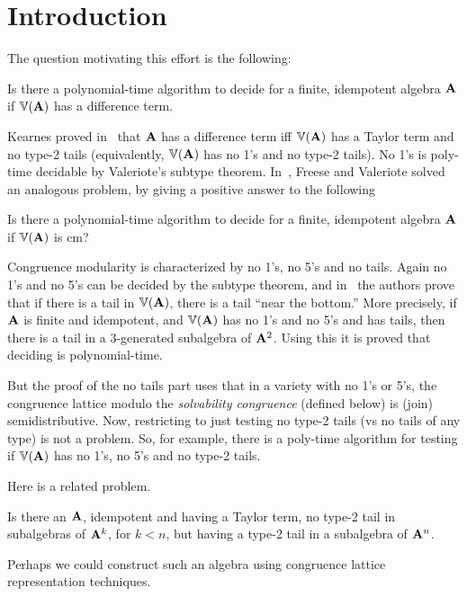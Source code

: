 \section{Introduction}
\label{sec:introduction}
The question motivating this effort is the following:
\begin{prob}
  \label{prob:1}
  Is there a polynomial-time algorithm to decide for a finite,
  idempotent algebra $\mathbf{A}$ if $\operatorname{\mathbb{V}}(\mathbf{A})$ has a difference term.
\end{prob}
Kearnes proved in~\cite{MR1358491} that $\mathbf{A}$ has a difference term iff
$\operatorname{\mathbb{V}}(\mathbf{A})$ has a Taylor term and no type-2 tails
(equivalently, $\operatorname{\mathbb{V}}(\mathbf{A})$ has no 1's and no type-2 tails).
No 1's is poly-time decidable by Valeriote's subtype theorem.
In~\cite{Freese:2009}, Freese and Valeriote solved an analogous problem, by
giving a positive answer to the following
\begin{prob}
  \label{prob:2}
  Is there a polynomial-time algorithm to decide for a finite,
  idempotent algebra $\mathbf{A}$ if $\operatorname{\mathbb{V}}(\mathbf{A})$ is \ac{cm}?
\end{prob}

Congruence modularity is characterized by no 1's, no 5's and no tails.
Again no 1's and no 5's can be decided by the subtype theorem,
and in~\cite{Freese:2009} the authors prove that if there is
a tail in $\operatorname{\mathbb{V}}(\mathbf{A})$, there is a tail ``near the bottom.''
More precisely, if $\mathbf{A}$ is finite and idempotent, and $\operatorname{\mathbb{V}}(\mathbf{A})$ has no
1's and no 5's and has tails, then there is a tail in a 3-generated subalgebra of $\mathbf{A}^2$.
Using this it is proved that deciding \cm is polynomial-time.

But the proof of the no tails part uses that in a variety with no 1's or 5's,
the congruence lattice modulo the {\it solvability congruence} (defined below)
is (join) semidistributive.
Now, restricting to just testing no type-2 tails (vs no tails of any type) is
not a problem. So, for example, there is a poly-time algorithm for testing if
$\operatorname{\mathbb{V}}(\mathbf{A})$ has no 1's, no 5's and no type-2 tails.  

Here is a related problem.
\begin{prob}
  \label{prob:3}
  Is there an $\mathbf{A}$, idempotent and having a Taylor term, no type-2 tail in 
  subalgebras of $\mathbf{A}^k$, for $k < n$, but having a type-2 tail in a subalgebra
  of $\mathbf{A}^n$. 
\end{prob}
Perhaps we could construct such an algebra using congruence lattice
representation techniques. 



